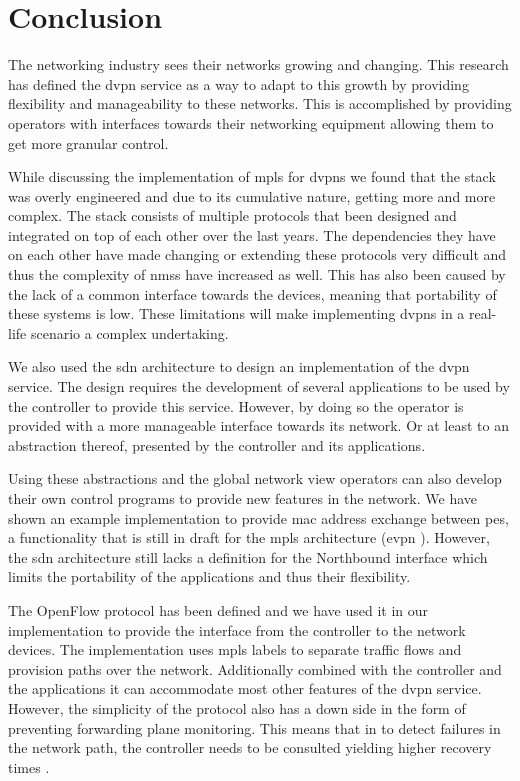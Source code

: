 \section{Conclusion} %
\label{sec:conclusion}

The networking industry sees their networks growing and changing. This research has defined the \ac{dvpn} service as a way to adapt to this growth by providing flexibility and manageability to these networks. This is accomplished by providing operators with interfaces towards their networking equipment allowing them to get more granular control.

While discussing the implementation of \ac{mpls} for \acp{dvpn} we found that the stack was overly engineered and due to its cumulative nature, getting more and more complex. The stack consists of multiple protocols that been designed and integrated on top of each other over the last years. The dependencies they have on each other have made changing or extending these protocols very difficult and thus the complexity of \acp{nms} have increased as well. This has also been caused by the lack of a common interface towards the devices, meaning that portability of these systems is low. These limitations will make implementing \acp{dvpn} in a real-life scenario a complex undertaking.

We also used the \ac{sdn} architecture to design an implementation of the \ac{dvpn} service. The design requires the development of several applications to be used by the controller to provide this service. However, by doing so the operator is provided with a more manageable interface towards its network. Or at least to an abstraction thereof, presented by the controller and its applications. 

Using these abstractions and the global network view operators can also develop their own control programs to provide new features in the network. We have shown an example implementation to provide \ac{mac} address exchange between \acp{pe}, a functionality that is still in draft for the \ac{mpls} architecture (\ac{evpn} \cite{evpn}). However, the \ac{sdn} architecture still lacks a definition for the Northbound interface which limits the portability of the applications and thus their flexibility.

The OpenFlow protocol has been defined and we have used it in our implementation to provide the interface from the controller to the network devices. The implementation uses \ac{mpls} labels to separate traffic flows and provision paths over the network. Additionally combined with the controller and the applications it can accommodate most other features of the \ac{dvpn} service. However, the simplicity of the protocol also has a down side in the form of preventing forwarding plane monitoring. This means that in to detect failures in the network path, the controller needs to be consulted yielding higher recovery times \cite{scalable-fault}.

